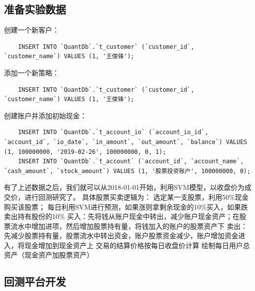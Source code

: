 \documentclass{article}
\begin{document}
\subsection{准备实验数据}
创建一个新客户：
\begin{lstlisting}
    INSERT INTO `QuantDb`.`t_customer` (`customer_id`, `customer_name`) VALUES (1, '王俊锋');
\end{lstlisting}
添加一个新策略：
\begin{lstlisting}
    INSERT INTO `QuantDb`.`t_customer` (`customer_id`, `customer_name`) VALUES (1, '王俊锋');
\end{lstlisting}
创建账户并添加初始现金：
\begin{lstlisting}
    INSERT INTO `QuantDb`.`t_account_io` (`account_io_id`, `account_id`, `io_date`, `in_amount`, `out_amount`, `balance`) VALUES (1, 100000000, '2019-02-26', 100000000, 0, 1);
    INSERT INTO `QuantDb`.`t_account` (`account_id`, `account_name`, `cash_amount`, `stock_amount`) VALUES (1, '股票投资账户', 100000000, 0);
\end{lstlisting}
有了上述数据之后，我们就可以从2018-01-01开始，利用SVM模型，以收盘价为成交价，进行回测研究了。\newline
具体股票买卖逻辑为：
选定某一支股票，利用50\%现金购买该股票；
每日利用SVM进行预测，如果涨则拿剩余现金的10\%买入，如果跌卖出持有股份的10\%
买入：先将钱从账户现金中转出，减少账户现金资产；在股票流水中增加进项，然后增加股票持有量，将钱加入的账户的股票资产下
卖出：先减少股票持有量，股票流水中转出资金，账户股票资金减少，账户增加资金进入，将现金增加到现金资产上
交易的结算价格按每日收盘价计算
绘制每日用户总资产（现金资产加股票资产）
\subsection{回测平台开发}
\end{document}
